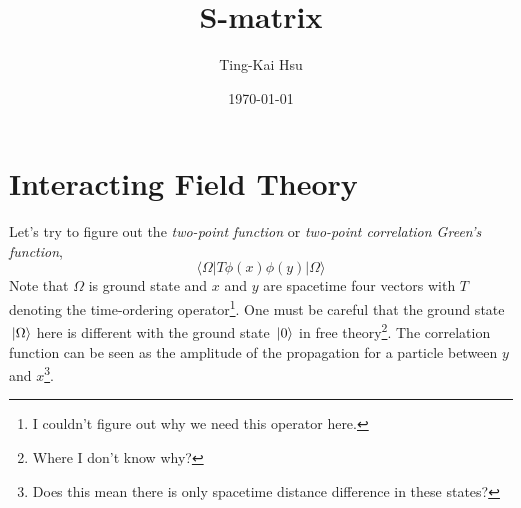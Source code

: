 \documentclass[12pt]{article}
\title{S-matrix}
\author{Ting-Kai Hsu}
\date{\today}
\numberwithin{equation}{section}
\begin{document}
\maketitle
\tableofcontents
\section{Interacting Field Theory}
Let's try to figure out the \textit{two-point function} or \textit{two-point correlation Green's function},
\begin{equation}
    \langle\Omega|T\phi(x)\phi(y)|\Omega\rangle
\end{equation}\label{1.1}
Note that $\Omega$ is ground state and $x$ and $y$ are spacetime four vectors with $T$ denoting the time-ordering operator\footnote{I couldn't figure out why we need this operator here.}.
One must be careful that the ground state $\ket*{\Omega}$ here is different with the ground state $\ket*{0}$ in free theory\footnote{Where I don't know why?}.
The correlation function can be seen as the amplitude of the propagation for a particle between $y$ and $x$\footnote{Does this mean there is only spacetime distance difference in these states?}.
\end{document}
